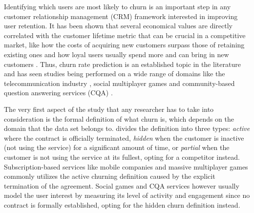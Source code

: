 \documentclass{kththesis}
\begin{document}
Identifying which users are most likely to churn is an important step in any customer relationship management (CRM) framework interested in improving user retention. It has been shown that several economical values are directly correlated with the customer lifetime metric that can be crucial in a competitive market, like how the costs of acquiring new customers surpass those of retaining existing ones and how loyal users usually spend more and can bring in new customers \citep{GurAli2014}. Thus, churn rate prediction is an established topic in the literature and has seen studies being performed on a wide range of domains like the telecommunication industry \citep{Lu2014}\citep{Khan2015}\citep{Hassouna2015}, social multiplayer games \citep{Borbora2011}\citep{Runge2014} and community-based question answering services (CQA) \citep{Pudipeddi2014}\citep{Dror2012}. 

The very first aspect of the study that any researcher has to take into consideration is the formal definition of what churn is, which depends on the domain that the data set belongs to. \citep{lazarov2007churn} divides the definition into three types: \emph{active} where the contract is officially terminated, \emph{hidden} when the customer is inactive (not using the service) for a significant amount of time, or \emph{partial} when the customer is not using the service at its fullest, opting for a competitor instead. Subscription-based services like mobile companies \citep{Lu2014}\citep{Hassouna2015} and massive multiplayer games \citep{Borbora2011} commonly utilizes the active churning definition caused by the explicit termination of the agreement. Social games \citep{Runge2014}\citep{Drachen2016RapidPO} and CQA services \citep{Pudipeddi2014}\citep{Dror2012} however usually model the user interest by measuring its level of activity and engagement since no contract is formally established, opting for the hidden churn definition instead. 
\end{document}
